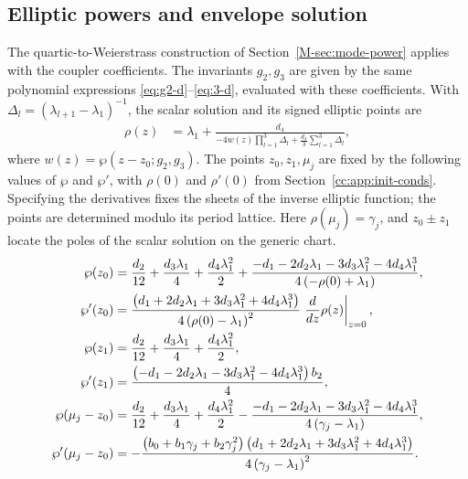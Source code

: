 \documentclass[11pt,a4paper]{article}
\begin{document}
\subsection{Elliptic powers and envelope solution}\label{cc:sec:mode-power}
The quartic-to-Weierstrass construction of Section~\ref*{M-sec:mode-power} applies with the coupler coefficients.
The invariants $g_2,g_3$ are given by the same polynomial expressions \eqref{eq:g2-d}--\eqref{eq:3-d}, evaluated with these coefficients.
With $\Delta_l=(\lambda_{l+1}-\lambda_1)^{-1}$, the scalar solution and its signed elliptic points are
\begin{align}
\rho{\left(z \right)} &= {\lambda}_{1} + \frac{d_4}{- 4 w{\left(z \right)} \prod_{l=1}^{3} {\Delta}_{l}  + \frac{d_4}{3} \sum_{l=1}^{3} {\Delta}_{l} }, \label{cc:eq:rho-wp-1}
\end{align}
where $w(z)=\wp(z-z_0;g_2,g_3)$.
The points $z_0,z_1,\mu_j$ are fixed by the following values of $\wp$ and $\wp'$, with $\rho(0)$ and $\rho'(0)$ from Section~\ref{cc:app:init-conds}.
Specifying the derivatives fixes the sheets of the inverse elliptic function; the points are determined modulo its period lattice.
Here $\rho(\mu_j)=\gamma_j$, and $z_0\pm z_1$ locate the poles of the scalar solution on the generic chart.
\begin{align}
\wp{\left(z_{0}\right)} &= \frac{{d}_{2}}{12} + \frac{{d}_{3} {\lambda}_{1}}{4} + \frac{{d}_{4} {\lambda}_{1}^{2}}{2} + \frac{- {d}_{1} - 2 {d}_{2} {\lambda}_{1} - 3 {d}_{3} {\lambda}_{1}^{2} - 4 {d}_{4} {\lambda}_{1}^{3}}{4 \left(- \rho{\left(0 \right)} + {\lambda}_{1}\right)}, \notag \\
\wp'{\left(z_{0}\right)} &= \frac{\left({d}_{1} + 2 {d}_{2} {\lambda}_{1} + 3 {d}_{3} {\lambda}_{1}^{2} + 4 {d}_{4} {\lambda}_{1}^{3}\right) }{4 \left(\rho{\left(0 \right)} - {\lambda}_{1}\right)^{2}}\left. \frac{d}{d z} \rho{\left(z \right)} \right|_{\substack{ z=0 }}, \notag \\
\wp{\left(z_{1}\right)} &= \frac{{d}_{2}}{12} + \frac{{d}_{3} {\lambda}_{1}}{4} + \frac{{d}_{4} {\lambda}_{1}^{2}}{2}, \notag \\
\wp'{\left(z_{1}\right)} &= \frac{\left(- {d}_{1} - 2 {d}_{2} {\lambda}_{1} - 3 {d}_{3} {\lambda}_{1}^{2} - 4 {d}_{4} {\lambda}_{1}^{3}\right) b_2}{4}, \notag \\
\wp{\left({\mu}_{j} - z_{0}\right)} &= \frac{{d}_{2}}{12} + \frac{{d}_{3} {\lambda}_{1}}{4} + \frac{{d}_{4} {\lambda}_{1}^{2}}{2} - \frac{- {d}_{1} - 2 {d}_{2} {\lambda}_{1} - 3 {d}_{3} {\lambda}_{1}^{2} - 4 {d}_{4} {\lambda}_{1}^{3}}{4 \left({\gamma}_{j} - {\lambda}_{1}\right)}, \notag \\
\wp'{\left({\mu}_{j}- z_{0}\right)} &= - \frac{\left({b}_{0} + {b}_{1} {\gamma}_{j} + {b}_{2} {\gamma}_{j}^{2}\right) \left({d}_{1} + 2 {d}_{2} {\lambda}_{1} + 3 {d}_{3} {\lambda}_{1}^{2} + 4 {d}_{4} {\lambda}_{1}^{3}\right)}{4 \left({\gamma}_{j} - {\lambda}_{1}\right)^{2}}. \label{cc:eq:wp-points}
\end{align}
\end{document}
